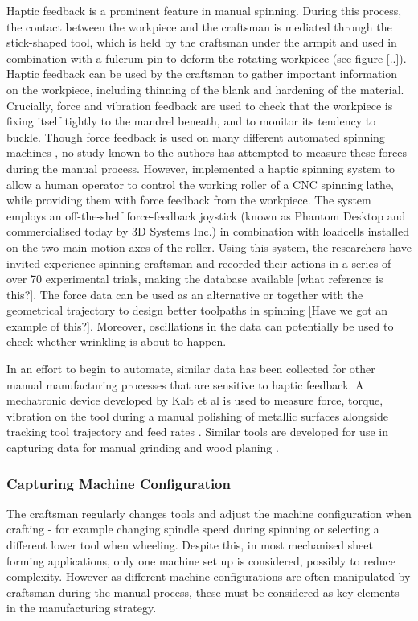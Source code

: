 Haptic feedback is a prominent feature in manual spinning. During this process, the contact between the workpiece and the craftsman is mediated through the stick-shaped tool, which is held by the craftsman under the armpit and used in combination with a fulcrum pin to deform the rotating workpiece (see figure [..]). Haptic feedback can be used by the craftsman to gather important information on the workpiece, including thinning of the blank and hardening of the material. Crucially, force and vibration feedback are used to check that the workpiece is fixing itself tightly to the mandrel beneath, and to monitor its tendency to buckle. Though force feedback is used on many different automated spinning machines \citep{Arai2006Force-controlledMotors}, no study known to the authors has attempted to measure these forces during the manual process. However, \citep{Russo2019HapticSpinning} implemented a haptic spinning system to allow a human operator to control the working roller of a CNC spinning lathe, while providing them with force feedback from the workpiece. The system employs an off-the-shelf force-feedback joystick (known as Phantom Desktop and commercialised today by 3D Systems Inc.) in combination with loadcells installed on the two main motion axes of the roller. Using this system, the researchers have invited experience spinning craftsman and recorded their actions in a series of over 70 experimental trials, making the database available \citep{Russo2020}[what reference is this?]. The force data can be used as an alternative or together with the geometrical trajectory to design better toolpaths in spinning [Have we got an example of this?]. Moreover, oscillations in the data can potentially be used to check whether wrinkling is about to happen. 

In an effort to begin to automate, similar data has been collected for other manual manufacturing processes that are sensitive to haptic feedback. A mechatronic device developed by Kalt et al is used to measure force, torque, vibration on the tool during a manual polishing of metallic surfaces alongside tracking tool trajectory and feed rates \citep{Kalt2016TowardsOperation}. Similar tools are developed for use in capturing data for manual grinding \citep{Phan2018InstrumentationWorkpiece} and wood planing \citep{Montebelli2015OnTasks}.


\subsubsection{Capturing Machine Configuration}
The craftsman regularly changes tools and adjust the machine configuration when crafting - for example changing spindle speed during spinning or selecting a different lower tool when wheeling. Despite this, in most mechanised sheet forming applications, only one machine set up is considered, possibly to reduce complexity. However as different machine configurations are often manipulated by craftsman during the manual process, these must be considered as key elements in the manufacturing strategy.

